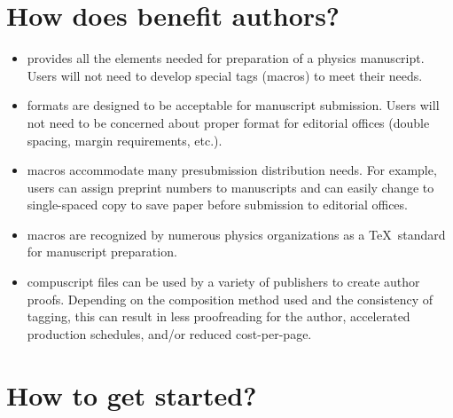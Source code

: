 \section{How does \REVTeX{} benefit authors?}
\begin{itemize}
\item \REVTeX{} provides all the elements needed for preparation of a
physics manuscript.   Users will not need to develop special tags (macros)
to meet their needs.

\item \REVTeX{} formats are designed to be acceptable for manuscript
submission.  Users will not need to be concerned about proper format for
editorial offices (double spacing, margin requirements, etc.).

\item \REVTeX{} macros accommodate many presubmission distribution needs.
For example, users can assign preprint numbers to manuscripts  and can
easily change to single-spaced copy to save paper before submission to
editorial offices.

\item \REVTeX{} macros are recognized by numerous physics organizations as
a \TeX\ standard for manuscript preparation.

\item \REVTeX{} compuscript files can be used by a variety of publishers to
create author proofs.  Depending on the composition method used and the
consistency of tagging, this can result in less proofreading for the
author, accelerated production schedules, and/or reduced cost-per-page.
\end{itemize}

\section{How to get started?}

